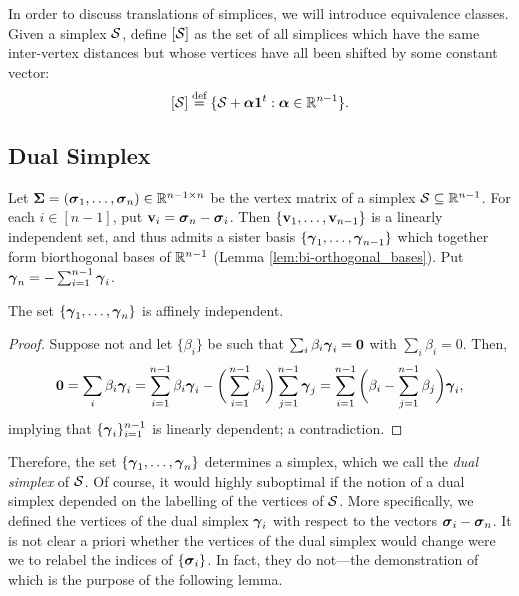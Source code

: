 In order to discuss translations of simplices, we will introduce equivalence classes. Given a simplex $\mathcal{S}$, define $[\mathcal{S}]$ as the set of all simplices which have the same inter-vertex distances but whose vertices have all been shifted by some constant vector: 
\[[\mathcal{S}] \overset{\text{def}}{=} \{\mathcal{S}+\vb*{\alpha}\vb{1}^t:\vb*{\alpha}\in\mathbb{R}^{n-1}\}.\]

 
 



\subsection{Dual Simplex}
\label{sec:background_dual_simplex}
Let $\boldsymbol{\Sigma}=(\vb*{\sigma}_1,\dots,\vb*{\sigma}_n)\in\mathbb{R}^{n-1\times n}$ be the vertex matrix of a simplex $\mathcal{S}\subseteq\mathbb{R}^{n-1}$. For each $i\in[n-1]$, put $\vb{v}_i=\vb*{\sigma}_n-\vb*{\sigma}_i$. Then $\{\vb{v}_1,\dots,\vb{v}_{n-1}\}$ is a linearly independent set, and thus admits a sister basis $\{\vb*{\gamma}_1,\dots,\vb*{\gamma}_{n-1}\}$ which together form biorthogonal bases of $\mathbb{R}^{n-1}$ (Lemma \ref{lem:bi-orthogonal_bases}). Put $\vb*{\gamma}_n = -\sum_{i=1}^{n-1}\vb*{\gamma}_i$.  

\begin{claim}
The set 
$\{\vb*{\gamma}_1,\dots,\vb*{\gamma}_n\}$ is affinely independent. 
\end{claim}
\begin{proof}
Suppose not and let $\{\beta_i\}$ be such that $\sum_i \beta_i \vb*{\gamma}_i =\vb{0}$ with $\sum_i\beta_i=0$. Then, 
\[\vb{0} = \sum_i\beta_i\vb*{\gamma}_i = \sum_{i=1}^{n-1} \beta_i \vb*{\gamma}_i - \bigg(\sum_{i=1}^{n-1} \beta_i\bigg)\sum_{j=1}^{n-1}\vb*{\gamma}_j = \sum_{i=1}^{n-1}\bigg(\beta_i-\sum_{j=1}^{n-1}\beta_j\bigg)\vb*{\gamma}_i,\]
implying that $\{\vb*{\gamma}_i\}_{i=1}^{n-1}$ is linearly dependent; a contradiction.  
\end{proof}

Therefore, the set $\{\vb*{\gamma}_1,\dots,\vb*{\gamma}_n\}$ determines a simplex, which we call the \emph{dual simplex} of $\mathcal{S}$. Of course, it would highly suboptimal if the notion of a dual simplex depended on the labelling of the vertices of $\mathcal{S}$. More specifically, we defined the vertices of the dual simplex $\vb*{\gamma}_i$ with respect to the vectors $\vb*{\sigma}_i-\vb*{\sigma}_n$. It is not clear a priori whether the vertices of the dual simplex would change were we to relabel the indices of $\{\vb*{\sigma}_i\}$. In fact, they do not---the demonstration of which is the purpose of the following lemma. 

